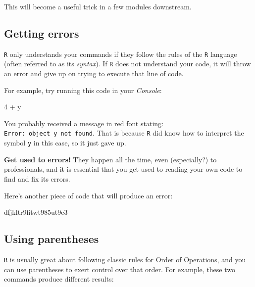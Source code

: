 \documentclass[
]{book}
\newenvironment{Shaded}{\begin{snugshade}}{\end{snugshade}}
\newcommand{\DecValTok}[1]{\textcolor[rgb]{0.00,0.00,0.81}{#1}}
\newcommand{\NormalTok}[1]{#1}
\newcommand{\SpecialCharTok}[1]{\textcolor[rgb]{0.00,0.00,0.00}{#1}}
\begin{document}
This will become a useful trick in a few modules downstream.

\hypertarget{getting-errors}{%
\subsection*{Getting errors}\label{getting-errors}}

\texttt{R} only understands your commands if they follow the rules of the \texttt{R} language (often referred to as its \emph{syntax}). If \texttt{R} does not understand your code, it will throw an error and give up on trying to execute that line of code.

For example, try running this code in your \emph{Console}:

\begin{Shaded}
\begin{Highlighting}[]
\DecValTok{4} \SpecialCharTok{+}\NormalTok{ y}
\end{Highlighting}
\end{Shaded}

You probably received a message in red font stating: \texttt{Error:\ object\ \textquotesingle{}y\textquotesingle{}\ not\ found}. That is because \texttt{R} did know how to interpret the symbol \texttt{y} in this case, so it just gave up.

\textbf{Get used to errors!} They happen all the time, even (especially?) to professionals, and it is essential that you get used to reading your own code to find and fix its errors.

Here's another piece of code that will produce an error:

\begin{Shaded}
\begin{Highlighting}[]
\NormalTok{dfjkltr9fitwt985ut9e3}
\end{Highlighting}
\end{Shaded}

\hypertarget{using-parentheses}{%
\subsection*{Using parentheses}\label{using-parentheses}}

\texttt{R} is usually great about following classic rules for Order of Operations, and you can use parentheses to exert control over that order. For example, these two commands produce different results:
\end{document}

